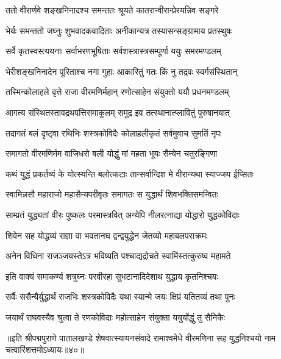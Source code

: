 \twolineshloka
{ततो वीरार्णवे शङ्खनिनादश्च समन्ततः}
{श्रूयते कातरान्वीरान्प्रेरयन्निव सङ्गरे}%

\twolineshloka
{भेर्यः समन्ततो जघ्नुः शुभवादकवादिताः}
{अनीकान्यत्र तस्यासन्सङ्ग्रामाय प्रतस्थुषः}%

\twolineshloka
{सर्वे कृतस्वस्त्ययनाः सर्वाभरणभूषिताः}
{सर्वशस्त्रास्त्रसम्पूर्णा ययुः समरमण्डलम्}%

\twolineshloka
{भेरीशङ्खनिनादेन पूरिताश्च नगा गुहाः}
{आकारितुं गतः किं नु तद्रवः स्वर्गसंस्थितान्}%

\twolineshloka
{तस्मिन्कोलाहले वृत्ते राजा वीरमणिर्महान्}
{रणोत्साहेन संयुक्तो ययौ प्रधनमण्डलम्}%

\twolineshloka
{आगत्य संस्थितस्तावद्रथपत्तिसमाकुलम्}
{समुद्र इव तत्स्थानात्प्लावितुं पुरुषानयात्}%

\twolineshloka
{तदागतं बलं दृष्ट्वा रथिभिः शस्त्रकोविदैः}
{कोलाहलीकृतं सर्वमुवाच सुमतिं नृपः}%


\twolineshloka
{समागतो वीरमणिर्मम वाजिधरो बली}
{योद्धुं मां महता भूयः सैन्येन चतुरङ्गिणा}%

\twolineshloka
{कथं युद्धं प्रकर्तव्यं के योत्स्यन्ति बलोत्कटाः}
{तान्सर्वान्दिश मे वीरान्यथा स्याज्जय ईप्सितः}%


\twolineshloka
{स्वामिन्नसौ महाराजो महासैन्यपरीवृतः}
{समागतः स युद्धार्थं शिवभक्तिसमन्वितः}%

\twolineshloka
{साम्प्रतं युद्ध्यतां वीरः पुष्कलः परमास्त्रवित्}
{अन्येपि नीलरत्नाद्या योद्धारो युद्धकोविदाः}%

\twolineshloka
{शिवेन सह योद्धव्यं राज्ञा वा भवतानघ}
{द्वन्द्वयुद्धेन जेतव्यो महाबलपराक्रमः}%

\twolineshloka
{अनेन विधिना राजञ्जयस्तेऽत्र भविष्यति}
{पश्चाद्यद्रोचते स्वामिंस्तत्कुरुष्व महामते}%


\twolineshloka
{इति वाक्यं समाकर्ण्य शत्रुघ्नः परवीरहा}
{सुभटानादिदेशाथ युद्धाय कृतनिश्चयः}%

\twolineshloka
{सर्वैः ससैन्यैर्युद्धार्थं राजभिः शस्त्रकोविदैः}
{यथा स्यान्मे जयः क्षिप्रं यतितव्यं तथा पुनः}%

\twolineshloka
{जयार्थं राघवस्यैव श्रुत्वा ते रणकोविदाः}
{महोत्साहेन संयुक्ता ययुर्योद्धुं तु सैनिकैः}%

॥इति श्रीपद्मपुराणे पातालखण्डे शेषवात्स्यायनसंवादे रामाश्वमेधे वीरमणिना सह युद्धनिश्चयो नाम चत्वारिंशत्तमोऽध्यायः॥४०॥

